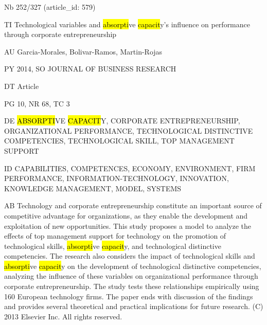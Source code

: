 \documentclass[a4paper]{article}
\begin{document}
\vspace*{-2cm}
Nb \tabto{0cm}252/327 (article\_id: 579)\par
TI \tabto{0cm}Technological variables and \hl{absorpti}ve \hl{capacit}y's influence on performance through corporate entrepreneurship\par
AU \tabto{0cm}Garcia-Morales, Bolivar-Ramos, Martin-Rojas\par
PY \tabto{0cm}2014, SO JOURNAL OF BUSINESS RESEARCH\par
DT \tabto{0cm}Article\par
PG \tabto{0cm}10, NR 68, TC 3\par
DE \tabto{0cm}\hl{ABSORPTI}VE \hl{CAPACIT}Y, CORPORATE ENTREPRENEURSHIP, ORGANIZATIONAL PERFORMANCE, TECHNOLOGICAL DISTINCTIVE COMPETENCIES, TECHNOLOGICAL SKILL, TOP MANAGEMENT SUPPORT\par
ID \tabto{0cm}CAPABILITIES, COMPETENCES, ECONOMY, ENVIRONMENT, FIRM PERFORMANCE, INFORMATION-TECHNOLOGY, INNOVATION, KNOWLEDGE MANAGEMENT, MODEL, SYSTEMS\par
AB \tabto{0cm}Technology and corporate entrepreneurship constitute an important source of competitive advantage for organizations, as they enable the development and exploitation of new opportunities. This study proposes a model to analyze the effects of top management support for technology on the promotion of technological skills, \hl{absorpti}ve \hl{capacit}y, and technological distinctive competencies. The research also considers the impact of technological skills and \hl{absorpti}ve \hl{capacit}y on the development of technological distinctive competencies, analyzing the influence of these variables on organizational performance through corporate entrepreneurship. The study tests these relationships empirically using 160 European technology firms. The paper ends with discussion of the findings and provides several theoretical and practical implications for future research. (C) 2013 Elsevier Inc. All rights reserved.\par
\clearpage
\end{document}
